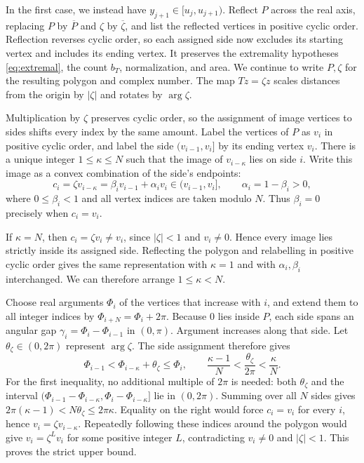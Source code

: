 \documentclass[11pt,a4paper]{article}
\theoremstyle{definition}
\theoremstyle{remark}
\numberwithin{equation}{section}
\begin{document}
In the first case, we instead have $y_{j+1}\in[u_j,u_{j+1})$. Reflect $P$ across the real axis, replacing $P$ by $\overline P$ and $\zeta$ by $\overline\zeta$, and list the reflected vertices in positive cyclic order. Reflection reverses cyclic order, so each assigned side now excludes its starting vertex and includes its ending vertex. It preserves the extremality hypotheses \eqref{eq:extremal}, the count $b_T$, normalization, and area. We continue to write $P,\zeta$ for the resulting polygon and complex number. The map $Tz=\zeta z$ scales distances from the origin by $|\zeta|$ and rotates by $\arg\zeta$.

Multiplication by $\zeta$ preserves cyclic order, so the assignment of image vertices to sides shifts every index by the same amount. Label the vertices of $P$ as $v_i$ in positive cyclic order, and label the side $(v_{i-1},v_i]$ by its ending vertex $v_i$. There is a unique integer $1\le\kappa\le N$ such that the image of $v_{i-\kappa}$ lies on side $i$. Write this image as a convex combination of the side's endpoints:
\begin{equation}\label{eq:contacts}
 c_i=\zeta v_{i-\kappa}
 =\beta_i v_{i-1}+\alpha_i v_i\in(v_{i-1},v_i],
 \qquad \alpha_i=1-\beta_i>0,
\end{equation}
where $0\le\beta_i<1$ and all vertex indices are taken modulo $N$. Thus $\beta_i=0$ precisely when $c_i=v_i$.

If $\kappa=N$, then $c_i=\zeta v_i\ne v_i$, since $|\zeta|<1$ and $v_i\ne0$. Hence every image lies strictly inside its assigned side. Reflecting the polygon and relabelling in positive cyclic order gives the same representation with $\kappa=1$ and with $\alpha_i,\beta_i$ interchanged. We can therefore arrange $1\le\kappa<N$.

Choose real arguments $\Phi_i$ of the vertices that increase with $i$, and extend them to all integer indices by $\Phi_{i+N}=\Phi_i+2\pi$. Because $0$ lies inside $P$, each side spans an angular gap $\gamma_i=\Phi_i-\Phi_{i-1}$ in $(0,\pi)$. Argument increases along that side. Let $\theta_\zeta\in(0,2\pi)$ represent $\arg\zeta$. The side assignment therefore gives
\begin{equation}\label{eq:lift}
 \Phi_{i-1}<\Phi_{i-\kappa}+\theta_\zeta\le\Phi_i,
 \qquad \frac{\kappa-1}{N}<\frac{\theta_\zeta}{2\pi}<\frac\kappa N.
\end{equation}
For the first inequality, no additional multiple of $2\pi$ is needed: both $\theta_\zeta$ and the interval $(\Phi_{i-1}-\Phi_{i-\kappa},\Phi_i-\Phi_{i-\kappa}]$ lie in $(0,2\pi)$. Summing over all $N$ sides gives $2\pi(\kappa-1)<N\theta_\zeta\le2\pi\kappa$. Equality on the right would force $c_i=v_i$ for every $i$, hence $v_i=\zeta v_{i-\kappa}$. Repeatedly following these indices around the polygon would give $v_i=\zeta^L v_i$ for some positive integer $L$, contradicting $v_i\ne0$ and $|\zeta|<1$. This proves the strict upper bound.
\end{document}
